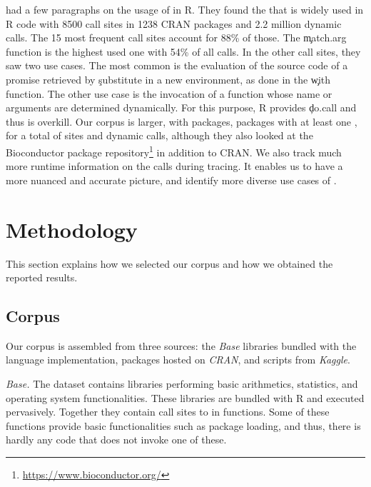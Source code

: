 \documentclass[review,screen,acmsmall]{acmart}
\newcommand{\mypara}[1]{\medskip\noindent\emph{#1}\xspace}
\begin{document}
\citet{ecoop12} had a few paragraphs on the usage of \eval in R. They found the
that \eval  is widely used in R code with 8500 call sites in 1238 CRAN packages and 2.2 million dynamic calls.   The 15 most frequent call sites account for 88\% of those. The
\c{match.arg} function is the highest used one with 54\% of all calls. In the
other call sites, they saw two use cases. The most common is the evaluation of
the source code of a promise retrieved by \c{substitute} in a new environment,
\eg as done in the \c{with} function. The other use case is the invocation of a
function whose name or arguments are determined dynamically. For this purpose, R provides \c{do.call} and thus \eval is overkill. Our corpus is larger, with \CranPackages packages, \packageTriggeredpkgs packages with at least one \eval, for a total of \PkgHitEvalCallSites sites and \packageAllcallsRnd dynamic calls, although they also looked at the Bioconductor package repository\footnote{\url{https://www.bioconductor.org/}} in addition to CRAN. We also track much more runtime information on the \eval calls during tracing. It enables us to have a more nuanced and accurate picture, and identify more diverse use cases of \eval.



\section{Methodology}

This section explains how we selected our corpus and how we obtained the
reported results.

\subsection{Corpus}

Our corpus is assembled from three sources: the \emph{Base} libraries bundled
with the language implementation, packages hosted on \emph{CRAN}, and scripts
from \emph{Kaggle}.

\mypara{Base.} The dataset contains \BasePackages libraries performing basic
arithmetics, statistics, and operating system functionalities. These libraries
are bundled with R and executed pervasively. Together they contain
\BaseEvalCallSites call sites to \eval in \BaseFunsWithEvals functions. Some of these
functions provide basic functionalities such as package loading, and thus, there
is hardly any code that does not invoke one of these.
\end{document}
